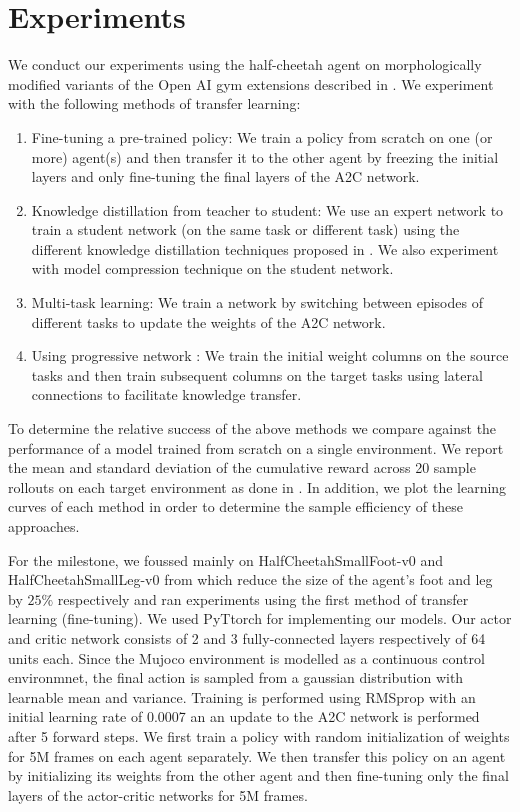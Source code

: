 \section{Experiments}
We conduct our experiments using the half-cheetah agent on morphologically modified variants of the Open AI gym extensions described in \cite{four}. We experiment with the following methods of transfer learning: 

\begin{enumerate}
\item Fine-tuning a pre-trained policy: We train a policy from scratch on one (or more) agent(s) and then transfer it to the other agent by freezing the initial layers and only fine-tuning the final layers of the A2C network.
\item Knowledge distillation from teacher to student: We use an expert network to train a student network (on the same task or different task) using the different  knowledge distillation techniques proposed in \cite{two}. We also experiment with model compression technique on the student network.  
\item Multi-task learning: We train a network by switching between episodes of different tasks to update the weights of the A2C network.  
\item Using progressive network \cite{three}:  We train the initial weight columns on the source tasks and then train subsequent columns on the target tasks using lateral connections to facilitate knowledge transfer.  
\end{enumerate}

To determine the relative success of the above methods we compare against the performance of a model trained from scratch on a single environment. We report the mean and standard deviation of the cumulative reward across 20 sample rollouts on each target environment as done in \cite{four}. In addition, we plot the learning curves of
each method in order to determine the sample efficiency of these approaches.

For the milestone, we foussed mainly on HalfCheetahSmallFoot-v0 and HalfCheetahSmallLeg-v0 from  \cite{four} which reduce the size of the agent's foot and leg by $25\%$ respectively and ran experiments using the first method of transfer learning (fine-tuning). We used PyTtorch for implementing our models. Our actor and critic network consists of 2 and 3 fully-connected layers respectively of 64 units each. Since the Mujoco environment is modelled as a continuous control environmnet, the final action is sampled from a gaussian distribution with learnable mean and variance. Training is performed using RMSprop with an initial learning rate of 0.0007 an an update to the A2C network is performed after 5 forward steps. We first train a policy with random initialization of weights for 5M frames on each agent separately. We then transfer this policy on an agent by initializing its weights from the other agent and then fine-tuning only the final layers of the actor-critic networks for 5M frames. 


